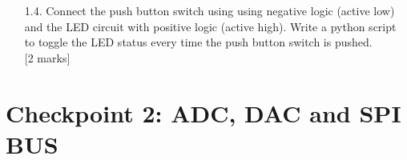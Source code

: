 \begin{enumerate}

\vspace*{-0.5cm}
\hfill [2 marks]\\


\item [1.4.]	  Connect the push button switch using  using negative logic (active low)  and the LED circuit with positive logic (active high).  Write a python script to toggle the LED status every time the push button switch is pushed. \\


\vspace*{-0.5cm}
\hfill [2 marks]\\


\end{enumerate}



\newpage
\section{Checkpoint 2: ADC, DAC and  SPI BUS}

